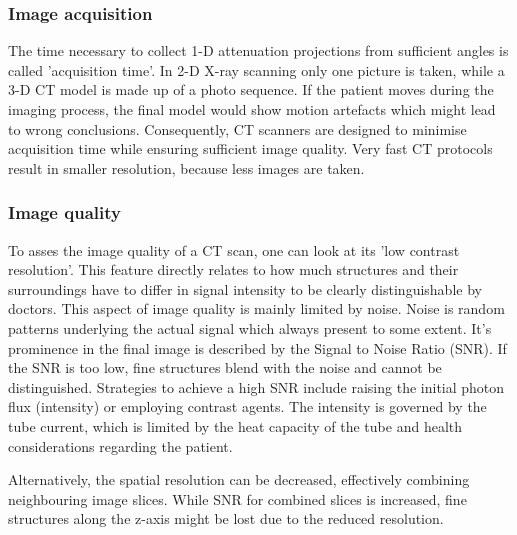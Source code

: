 \subsubsection{Image acquisition}
The time necessary to collect 1-D attenuation projections from sufficient angles is called 'acquisition time'.
In 2-D X-ray scanning only one picture is taken, while a 3-D CT model is made up of a photo sequence.
If the patient moves during the imaging process, the final model would show motion artefacts which might lead to wrong conclusions.
Consequently, CT scanners are designed to minimise acquisition time while ensuring sufficient image quality.
Very fast CT protocols result in smaller resolution, because less images are taken. \cite{Podgorsak, Maidment2014}

\subsubsection{Image quality} %
To asses the image quality of a CT scan, one can look at its 'low contrast resolution'. This feature directly relates to how much structures and their surroundings have to differ in signal intensity to be clearly distinguishable by doctors.
This aspect of image quality is mainly limited by noise.
Noise is random patterns underlying the actual signal which always present to some extent.
It's prominence in the final image is described by the Signal to Noise Ratio (SNR).
If the SNR is too low, fine structures blend with the noise and cannot be distinguished. 
Strategies to achieve a high SNR include raising the initial photon flux (intensity) or employing contrast agents.
The intensity is governed by the tube current, which is limited by the heat capacity of the tube and health considerations regarding the patient.

Alternatively, the spatial resolution can be decreased, effectively combining neighbouring image slices.
While SNR for combined slices is increased, fine structures along the z-axis might be lost due to the reduced resolution. \cite{Podgorsak, Maidment2014}

